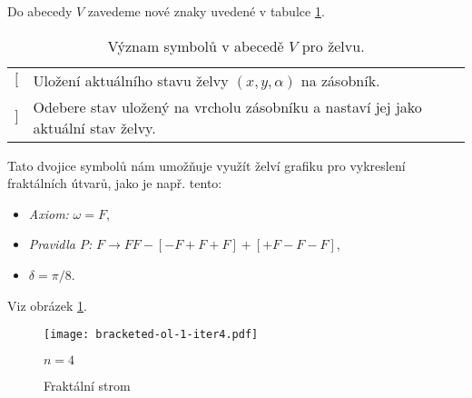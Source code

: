 Do abecedy $V$ zavedeme nové znaky uvedené v tabulce \ref{table:vyznam-symbolu-zelva-zasobnik}. 
\begin{table}[H]
    \centering
    \begin{tabular}{lp{}}
        $[$ & Uložení aktuálního stavu želvy $(x,y,\alpha)$ na zásobník.\\
        $]$ & Odebere stav uložený na vrcholu zásobníku a nastaví jej jako aktuální stav želvy.
    \end{tabular}
    \caption{Význam symbolů v abecedě $V$ pro želvu.}
    \label{table:vyznam-symbolu-zelva-zasobnik}
\end{table}
Tato dvojice symbolů nám umožňuje využít želví grafiku pro vykreslení fraktálních útvarů, jako je např. tento:
\begin{itemize}
    \item \emph{Axiom:} $\omega=F$,
    \item \emph{Pravidla $P$:} $F\to FF-[-F+F+F]+[+F-F-F]$,
    \item $\delta=\pi/8$.
\end{itemize}
Viz obrázek \ref{fig:fraktalni-strom}.
\begin{figure}[h]
    \centering
    \texttt{[image: bracketed-ol-1-iter4.pdf]}
    \begin{center}
        $n=4$
    \end{center}
    \caption{Fraktální strom}
    \label{fig:fraktalni-strom}
\end{figure}

